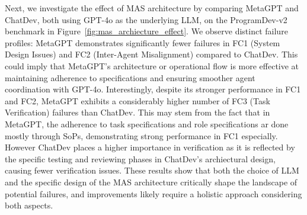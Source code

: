 Next, we investigate the effect of MAS architecture by comparing MetaGPT and ChatDev, both using GPT-4o as the underlying LLM, on the ProgramDev-v2 benchmark  in Figure~\ref{fig:mas_archiecture_effect}. We observe distinct failure profiles: MetaGPT demonstrates significantly fewer failures in FC1 (System Design Issues) and FC2 (Inter-Agent Misalignment) compared to ChatDev. This could imply that MetaGPT's architecture or operational flow is more effective at maintaining adherence to specifications and ensuring smoother agent coordination with GPT-4o. Interestingly, despite its stronger performance in FC1 and FC2, MetaGPT exhibits a considerably higher number of FC3 (Task Verification) failures than ChatDev. 
This may stem from the fact that in MetaGPT, the adherence to task specifications and role specifications ar done mostly through SoPs, demonstrating strong performance in FC1 especially. However ChatDev places a higher importance in verification as it is reflected by the specific testing and reviewing phases in ChatDev's archiectural design, causing fewer verification issues.
These results show that both the choice of LLM and the specific design of the MAS architecture critically shape the landscape of potential failures, and improvements likely require a holistic approach considering both aspects.




